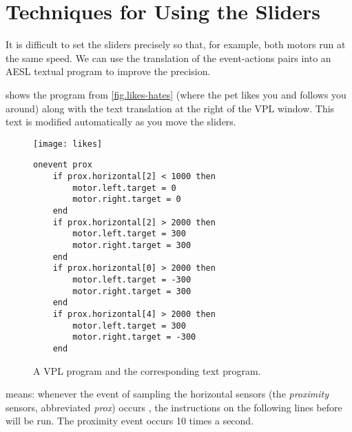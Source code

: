 \chapter{Techniques for Using the Sliders}\label{a.tech}


It is difficult to set the sliders precisely so that, for example, both
motors run at the same speed. We can use the translation of the
event-actions pairs into an AESL textual program to improve the
precision.


 shows the program from
\cref{fig.likes-hates} (where the pet likes you and follows you around)
along with the text translation at the right of the VPL window. This
text is modified automatically as you move the sliders.

\begin{figure}[hbt]
\texttt{[image: likes]}
\hfill
\begin{minipage}[b]{0.55\textwidth}
\begin{footnotesize}
\begin{verbatim}
onevent prox
    if prox.horizontal[2] < 1000 then
        motor.left.target = 0
        motor.right.target = 0
    end
    if prox.horizontal[2] > 2000 then
        motor.left.target = 300
        motor.right.target = 300
    end
    if prox.horizontal[0] > 2000 then
        motor.left.target = -300
        motor.right.target = 300
    end
    if prox.horizontal[4] > 2000 then
        motor.left.target = 300
        motor.right.target = -300
    end
\end{verbatim}
\end{footnotesize}
\vspace*{8ex}
\end{minipage}
\caption{A VPL program and the corresponding text program.}
\label{fig.textcode}
\end{figure}

 means: whenever the event of sampling the horizontal
sensors (the \emph{proximity} sensors, abbreviated \emph{prox})
occurs , the instructions on the following lines before  will be
run. The proximity event occurs 10 times a second.

